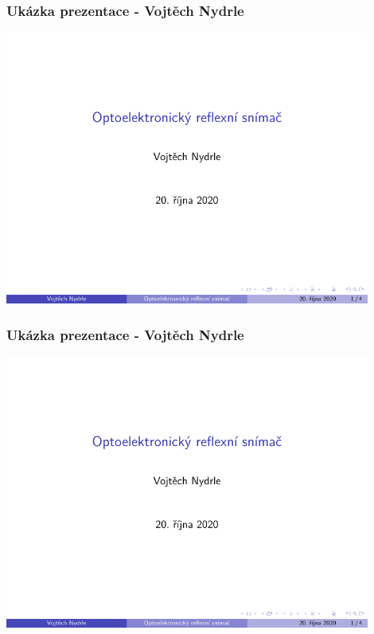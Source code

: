 \documentclass{beamer}
\begin{document}
	\begin{frame}
    \frametitle{Ukázka prezentace - Vojtěch Nydrle}
		
		\includegraphics[page=3,width=0.9\textwidth]{pdf/prezentace_Vojtech_Nydrle.pdf}
	
	\end{frame}
	\begin{frame}
    \frametitle{Ukázka prezentace - Vojtěch Nydrle}
		
		\includegraphics[page=4,width=0.9\textwidth]{pdf/prezentace_Vojtech_Nydrle.pdf}
	
	\end{frame}
\end{document}
